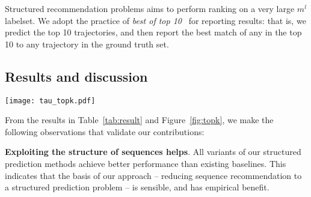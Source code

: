 Structured recommendation problems aims to perform ranking on a very large $m^l$ labelset.
We adopt the practice of {\em best of top 10}~\cite{russakovsky2015imagenet} for reporting results:
that is, we predict the top 10 trajectories, and then report the best match of any in the top 10 to any trajectory in the ground truth set.

\secmoveup
\subsection{Results and discussion}
\label{sec:result}
\textmoveup




\begin{minipage}[t]{0.8\linewidth}
		\texttt{[image: tau\_topk.pdf]}
	    \label{fig:topk}
\end{minipage}

From the results in Table~\ref{tab:result} and Figure~\ref{fig:topk}, we make the following observations that validate our contributions:

\textbf{Exploiting the structure of sequences helps}.
All variants of our structured prediction methods achieve better performance than existing baselines.
This indicates that the basis of our approach -- reducing sequence recommendation to a structured prediction problem -- is sensible, and has empirical benefit.

